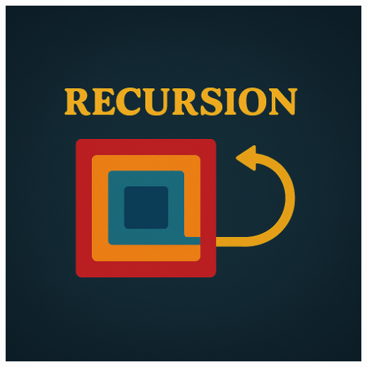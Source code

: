 \documentclass[a4paper,10pt]{book}
\begin{document}
\begin{center}
\includegraphics[height=13.88cm, width=17cm, keepaspectratio]{Pics/recursion.png}
\end{center}
\end{document}
